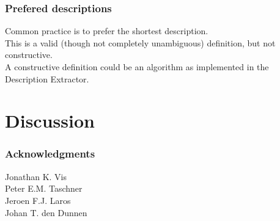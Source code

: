 \documentclass[14pt]{beamer}
\begin{document}
\begin{frame}
  \frametitle{Prefered descriptions}

  Common practice is to prefer the \textcolor{hgvs}{shortest} description.\\[2em]

  This is a valid (though not completely unambiguous) definition, but not
  \textcolor{hgvs}{constructive}.\\[2em]

  A constructive definition could be an algorithm as implemented in the
  Description Extractor.
\end{frame}


\section*{Discussion}


\begin{frame}
  \frametitle{Acknowledgments}

  Jonathan K. Vis\\
  Peter E.M. Taschner\\
  Jeroen F.J. Laros\\
  Johan T. den Dunnen
\end{frame}
\end{document}
